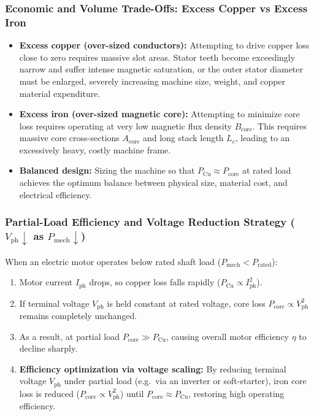 \subsubsection{Economic and Volume Trade-Offs: Excess Copper vs Excess Iron}
\begin{itemize}
  \item \textbf{Excess copper (over-sized conductors):} Attempting to drive copper loss close to zero requires massive slot areas. Stator teeth become exceedingly narrow and suffer intense magnetic saturation, or the outer stator diameter must be enlarged, severely increasing machine size, weight, and copper material expenditure.
  \item \textbf{Excess iron (over-sized magnetic core):} Attempting to minimize core loss requires operating at very low magnetic flux density $B_{\mathrm{core}}$. This requires massive core cross-sections $A_{\mathrm{core}}$ and long stack length $L_c$, leading to an excessively heavy, costly machine frame.
  \item \textbf{Balanced design:} Sizing the machine so that $P_{\mathrm{Cu}} \approx P_{\mathrm{core}}$ at rated load achieves the optimum balance between physical size, material cost, and electrical efficiency.
\end{itemize}

\subsubsection{Partial-Load Efficiency and Voltage Reduction Strategy ($V_{\mathrm{ph}} \downarrow$ as $P_{\mathrm{mech}} \downarrow$)}
When an electric motor operates below rated shaft load ($P_{\mathrm{mech}} < P_{\mathrm{rated}}$):
\begin{enumerate}
  \item Motor current $I_{\mathrm{ph}}$ drops, so copper loss falls rapidly ($P_{\mathrm{Cu}} \propto I_{\mathrm{ph}}^2$).
  \item If terminal voltage $V_{\mathrm{ph}}$ is held constant at rated voltage, core loss $P_{\mathrm{core}} \propto V_{\mathrm{ph}}^2$ remains completely unchanged.
  \item As a result, at partial load $P_{\mathrm{core}} \gg P_{\mathrm{Cu}}$, causing overall motor efficiency $\eta$ to decline sharply.
  \item \textbf{Efficiency optimization via voltage scaling:} By reducing terminal voltage $V_{\mathrm{ph}}$ under partial load (e.g.\ via an inverter or soft-starter), iron core loss is reduced ($P_{\mathrm{core}} \propto V_{\mathrm{ph}}^2$) until $P_{\mathrm{core}} \approx P_{\mathrm{Cu}}$, restoring high operating efficiency.
\end{enumerate}

